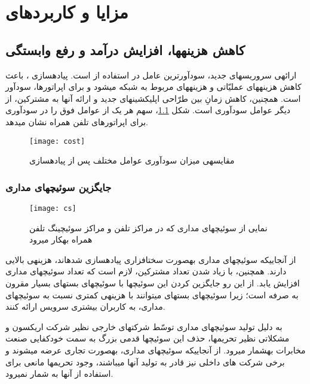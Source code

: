 \chapter{مزایا و کاربردهای }
 \label{benefitsPart}
\section{کاهش هزینه\nf ها، افزایش درآمد و رفع وابستگی}

ارائه\nf ی سروریس\nf های جدید، سودآورترین عامل در استفاده از  است. پیاده\nf سازی ، باعث کاهش هزینه\nf های عملیّاتی و هزینه\nf های مربوط به شبکه می\nf شود و برای اپراتورها، سودآور است. همچنین، کاهش زمانِ بین طرّاحی اپلیکشین\nf های جدید و ارائه آن\nf ها به مشترکین، از دیگر عوامل سودآوری است. شکل \ref{cost}، سهم هر یک از عوامل فوق را در سودآوری برای اپراتورهای تلفن همراه نشان می\nf دهد\cite{blended}.

\begin{figure}[h]
\centering
\texttt{[image: cost]}
\caption{مقایسه\nf ی میزان سودآوری عوامل مختلف پس از پیاده\nf سازی }
\label{cost}
\end{figure}

\subsection{جایگزین سوئیچ\nf های مداری}
\begin{figure}[h]
\centering
\texttt{[image: cs]}
\caption{نمایی از سوئیچ\nf های مداری که در مراکز تلفن و مراکز سوئیچینگ تلفن همراه به\nf کار می\nf رود}
\label{cs}
\end{figure}

از آنجایی\nf که سوئیچ\nf های مداری به\nf صورت سخت\nf افزاری پیاده\nf سازی شده\nf اند، هزینه\nf ی بالایی دارند. همچنین، با زیاد شدن تعداد مشترکین، لازم است که تعداد سوئیچ\nf های مداری افزایش یابد. از این رو جایگزین کردن این سوئیچ\nf ها با سوئیچ\nf های بسته\nf ای بسیار مقرون به صرفه است؛ زیرا  سوئیچ\nf های بسته\nf ای می\nf توانند با هزینه\nf ی کمتری نسبت به سوئیچ\nf های مداری، به کاربران بیشتری سرویس ارائه کنند.

 به دلیل تولید سوئیچ\nf های مداری توسّط شرکت\nf های خارجی نظیر شرکت اریکسون و مشکلاتی نظیر تحریم\nf ها، حذف این سوئیچ\nf ها قدمی بزرگ به سمت خودکفایی صنعت مخابرات به\nf شمار می\nf رود. از آنجایی\nf که سوئیچ\nf های مداری، به\nf صورت تجاری عرضه می\nf شوند و برخی شرکت \nf های داخلی نیز قادر به تولید آن\nf ها می\nf باشند، وجود تحریم\nf ها مانعی برای استفاده از آن\nf ها به شمار نمی\nf رود.
 

